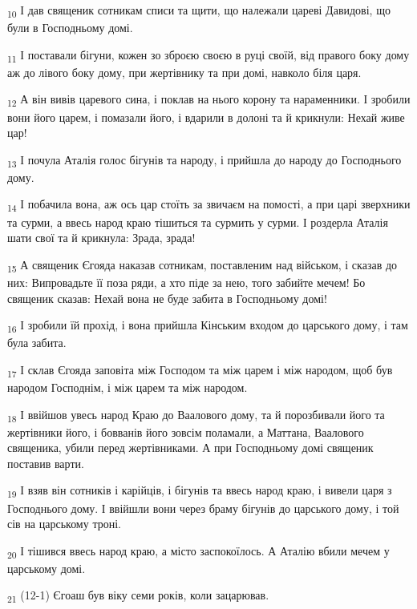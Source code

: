 \begin{tcolorbox}
\textsubscript{10} І дав священик сотникам списи та щити, що належали цареві Давидові, що були в Господньому домі.
\end{tcolorbox}
\begin{tcolorbox}
\textsubscript{11} І поставали бігуни, кожен зо зброєю своєю в руці своїй, від правого боку дому аж до лівого боку дому, при жертівнику та при домі, навколо біля царя.
\end{tcolorbox}
\begin{tcolorbox}
\textsubscript{12} А він вивів царевого сина, і поклав на нього корону та нараменники. І зробили вони його царем, і помазали його, і вдарили в долоні та й крикнули: Нехай живе цар!
\end{tcolorbox}
\begin{tcolorbox}
\textsubscript{13} І почула Аталія голос бігунів та народу, і прийшла до народу до Господнього дому.
\end{tcolorbox}
\begin{tcolorbox}
\textsubscript{14} І побачила вона, аж ось цар стоїть за звичаєм на помості, а при царі зверхники та сурми, а ввесь народ краю тішиться та сурмить у сурми. І роздерла Аталія шати свої та й крикнула: Зрада, зрада!
\end{tcolorbox}
\begin{tcolorbox}
\textsubscript{15} А священик Єгояда наказав сотникам, поставленим над військом, і сказав до них: Випровадьте її поза ряди, а хто піде за нею, того забийте мечем! Бо священик сказав: Нехай вона не буде забита в Господньому домі!
\end{tcolorbox}
\begin{tcolorbox}
\textsubscript{16} І зробили їй прохід, і вона прийшла Кінським входом до царського дому, і там була забита.
\end{tcolorbox}
\begin{tcolorbox}
\textsubscript{17} І склав Єгояда заповіта між Господом та між царем і між народом, щоб був народом Господнім, і між царем та між народом.
\end{tcolorbox}
\begin{tcolorbox}
\textsubscript{18} І ввійшов увесь народ Краю до Ваалового дому, та й порозбивали його та жертівники його, і бовванів його зовсім поламали, а Маттана, Ваалового священика, убили перед жертівниками. А при Господньому домі священик поставив варти.
\end{tcolorbox}
\begin{tcolorbox}
\textsubscript{19} І взяв він сотників і карійців, і бігунів та ввесь народ краю, і вивели царя з Господнього дому. І ввійшли вони через браму бігунів до царського дому, і той сів на царському троні.
\end{tcolorbox}
\begin{tcolorbox}
\textsubscript{20} І тішився ввесь народ краю, а місто заспокоїлось. А Аталію вбили мечем у царському домі.
\end{tcolorbox}
\begin{tcolorbox}
\textsubscript{21} (12-1) Єгоаш був віку семи років, коли зацарював.
\end{tcolorbox}
